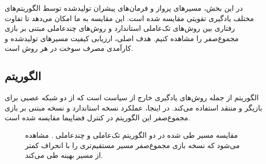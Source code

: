 در این بخش، مسیرهای پرواز و فرمان‌های پیشران تولیدشده توسط الگوریتم‌های مختلف یادگیری تقویتی مقایسه شده است. این مقایسه به ما امکان می‌دهد تا تفاوت رفتاری بین روش‌های تک‌عاملی استاندارد و روش‌های چندعاملی مبتنی بر بازی مجموع‌صفر را مشاهده کنیم. هدف اصلی، ارزیابی کیفیت مسیرهای تولیدشده و کارآمدی مصرف سوخت در هر روش است.

\subsection{الگوریتم }

الگوریتم   از جمله روش‌های یادگیری خارج از سیاست است که از دو شبکه عصبی برای بازیگر و منتقد استفاده می‌کند. در اینجا، عملکرد نسخه استاندارد و نسخه مبتنی بر بازی مجموع‌صفر این الگوریتم در کنترل فضاپیما مقایسه شده است.

\begin{figure}[H]
	\centering
	
	
	\caption{
		مقایسه مسیر طی شده در دو الگوریتم تک‌عاملی و چندعاملی .
		مشاهده می‌شود که نسخه بازی مجموع‌صفر مسیر مستقیم‌تری را با انحراف کمتر از مسیر بهینه طی می‌کند.
	}
\end{figure}


